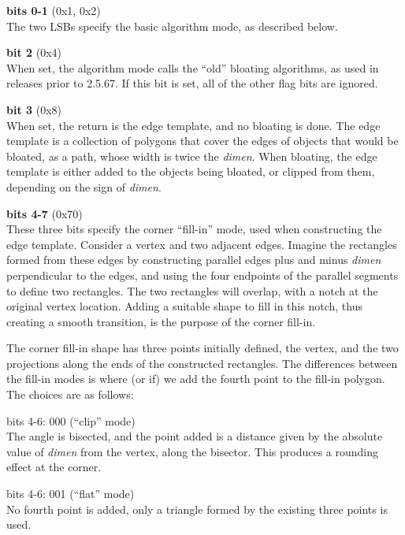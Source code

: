\begin{description}
\item{\bf bits 0-1} (0x1, 0x2)\\
The two LSBs specify the basic algorithm mode, as described below.

\item{\bf bit 2} (0x4)\\
When set, the algorithm mode calls the ``old'' bloating algorithms, as
used in releases prior to 2.5.67.  If this bit is set, all of the
other flag bits are ignored.

\item{\bf bit 3} (0x8)\\
When set, the return is the edge template, and no bloating is done. 
The edge template is a collection of polygons that cover the edges of
objects that would be bloated, as a path, whose width is twice the
{\it dimen}.  When bloating, the edge template is either added to the
objects being bloated, or clipped from them, depending on the sign of
{\it dimen}.

\item{\bf bits 4-7} (0x70)\\
These three bits specify the corner ``fill-in'' mode, used when
constructing the edge template.  Consider a vertex and two adjacent
edges.  Imagine the rectangles formed from these edges by constructing
parallel edges plus and minus {\it dimen} perpendicular to the edges,
and using the four endpoints of the parallel segments to define two
rectangles.  The two rectangles will overlap, with a notch at the
original vertex location.  Adding a suitable shape to fill in this
notch, thus creating a smooth transition, is the purpose of the corner
fill-in.

The corner fill-in shape has three points initially defined, the
vertex, and the two projections along the ends of the constructed
rectangles.  The differences between the fill-in modes is where (or
if) we add the fourth point to the fill-in polygon.  The choices are
as follows:

\begin{description}
\item{ bits 4-6: 000 (``clip'' mode)}\\
The angle is bisected, and the point added is a distance given
by the absolute value of {\it dimen} from the vertex, along
the bisector.  This produces a rounding effect at the corner.

\item{bits 4-6: 001 (``flat'' mode)}\\
No fourth point is added, only a triangle formed by the existing three
points is used.


\end{description}
\end{description}
